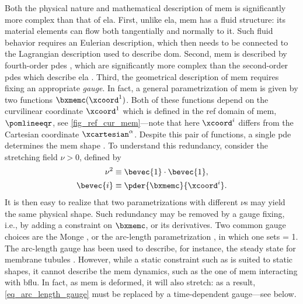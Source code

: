 Both the physical nature and mathematical description of \ac{mem} is significantly more complex than that of \ac{ela}. First, unlike \ac{ela}, \ac{mem} has a fluid structure: its material elements can flow both tangentially and normally to it.
Such fluid behavior requires an Eulerian description, which then needs to be connected to the Lagrangian description used to describe \ac{dom}. Second, \ac{mem} is described by fourth-order \acp{pde} \cite{zhong-canBendingEnergyVesicle1989}, which are significantly more complex than the second-order \acp{pde} which describe \ac{ela} \cite{worthmullerIRENEFluIdLayeR2025}. Third, the geometrical description of \ac{mem} requires fixing an appropriate \textit{gauge}.
In fact, a general parametrization of \ac{mem} is given by two functions $\bxmemc(\xcoord^1)$. Both of these functions  depend on the curvilinear coordinate $\xcoord^1$ which is defined in the \ac{ref} domain of \ac{mem}, $\pomlineeqr$, see \cref{fig_ref_cur_mem}---note that here $\xcoord^i$ differs from the Cartesian coordinate $\xcartesian^\alpha$.
Despite this pair of functions, a single \ac{pde}  determines the \ac{mem} shape \cite{zhong-canBendingEnergyVesicle1989}.
To understand this redundancy, consider the  stretching field $\nu>0$, defined by
\begin{align}\label{eq_intro_nu}
    \nu ^ 2   & \equiv \bevec{1}   \cdot \bevec{1}, \\
    \label{eq_def_e}
    \bevec{i} & \equiv \pder{{\bxmemc}}{\xcoord^i}.
\end{align}
It is then easy to realize that two  parametrizations with different $\nu$s
may yield the same physical shape. Such  redundancy  may be removed by a gauge fixing, i.e., by adding a constraint on $\bxmemc$, or its derivatives.
Two common gauge choices are the Monge  \cite{hsiungFirstCourseDifferential1981,desernoFluidLipidMembranes2015}, or the arc-length parametrization \cite{derenyiFormationInteractionMembrane2002}, in which one sets
\be
\label{eq_arc_length_gauge}
\nu = 1.
\ee
The arc-length gauge has been used to describe, for instance, the steady state for membrane tubules \cite{derenyiFormationInteractionMembrane2002}. However, while a static constraint such as  is suited to  static shapes, it cannot describe the  \ac{mem} dynamics, such as the one of \ac{mem} interacting with \ac{bflu}. In fact, as \ac{mem} is deformed, it will also stretch: as a result, \cref{eq_arc_length_gauge} must be replaced by a time-dependent  gauge---see below.

